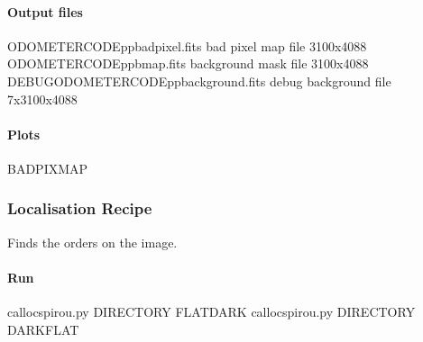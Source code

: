 \documentclass[a4paper,10pt,english]{report}
\begin{document}
\paragraph{Output files}
\label{\detokenize{user/spirou/recipes/bad_pixel:output-files}}
\begin{sphinxVerbatim}[commandchars=\\\{\}]
ODOMETER\PYGZus{}CODE\PYGZus{}pp\PYGZus{}badpixel.fits   bad pixel map file 3100x4088
ODOMETER\PYGZus{}CODE\PYGZus{}pp\PYGZus{}bmap.fits       background mask file 3100x4088
DEBUG\PYGZus{}ODOMETER\PYGZus{}CODE\PYGZus{}pp\PYGZus{}background.fits  debug background file 7x3100x4088
\end{sphinxVerbatim}


\paragraph{Plots}
\label{\detokenize{user/spirou/recipes/bad_pixel:plots}}
\begin{sphinxVerbatim}[commandchars=\\\{\}]
BADPIX\PYGZus{}MAP
\end{sphinxVerbatim}


\subsubsection{Localisation Recipe}
\label{\detokenize{user/spirou/recipes/localisation:localisation-recipe}}\label{\detokenize{user/spirou/recipes/localisation:recipes-spirou-localisation}}\label{\detokenize{user/spirou/recipes/localisation::doc}}
Finds the orders on the image.


\paragraph{Run}
\label{\detokenize{user/spirou/recipes/localisation:run}}
\begin{sphinxVerbatim}[commandchars=\\\{\}]
cal\PYGZus{}loc\PYGZus{}spirou.py \PYG{o}{[}DIRECTORY\PYG{o}{]} \PYG{o}{[}FLAT\PYGZus{}DARK\PYG{o}{]}
cal\PYGZus{}loc\PYGZus{}spirou.py \PYG{o}{[}DIRECTORY\PYG{o}{]} \PYG{o}{[}DARK\PYGZus{}FLAT\PYG{o}{]}
\end{sphinxVerbatim}
\end{document}
